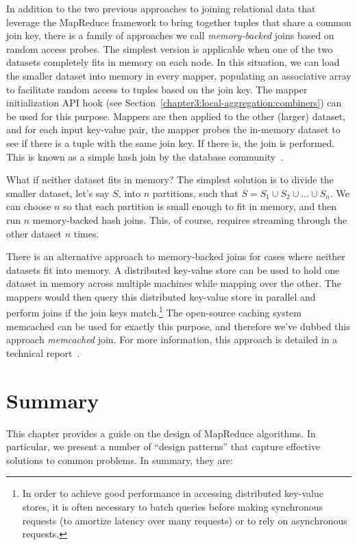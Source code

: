 In addition to the two previous approaches to joining relational data
that leverage the MapReduce framework to bring together tuples that
share a common join key, there is a family of approaches we call
\emph{memory-backed} joins based on random access probes.  The
simplest version is applicable when one of the two datasets completely
fits in memory on each node.  In this situation, we can load the
smaller dataset into memory in every mapper, populating an associative
array to facilitate random access to tuples based on the join key.
The mapper initialization API hook (see
Section~\ref{chapter3:local-aggregation:combiners}) can be used for
this purpose.  Mappers are then applied to the other (larger) dataset,
and for each input key-value pair, the mapper probes the in-memory
dataset to see if there is a tuple with the same join key.  If there
is, the join is performed.  This is known as a simple hash join by the
database community~\cite{DeWitt_etal_1984}.

What if neither dataset fits in memory?  The simplest solution is to
divide the smaller dataset, let's say $S$, into $n$ partitions, such
that $S= S_1 \cup S_2 \cup \ldots \cup S_n$.  We can choose $n$ so
that each partition is small enough to fit in memory, and then run $n$
memory-backed hash joins.  This, of course, requires streaming through
the other dataset $n$ times.

There is an alternative approach to memory-backed joins for cases
where neither datasets fit into memory.  A distributed key-value store
can be used to hold one dataset in memory across multiple machines
while mapping over the other.  The mappers would then query this
distributed key-value store in parallel and perform joins if the join
keys match.\footnote{In order to achieve good performance in accessing
  distributed key-value stores, it is often necessary to batch queries
  before making synchronous requests (to amortize latency over many
  requests) or to rely on asynchronous requests.}  The open-source
caching system memcached can be used for exactly this purpose, and
therefore we've dubbed this approach {\it memcached} join.  For more
information, this approach is detailed in a technical
report~\cite{Lin_etal_TR2009}.

\section{Summary}

This chapter provides a guide on the design of MapReduce algorithms.
In particular, we present a number of ``design patterns'' that capture
effective solutions to common problems.  In summary, they are:


